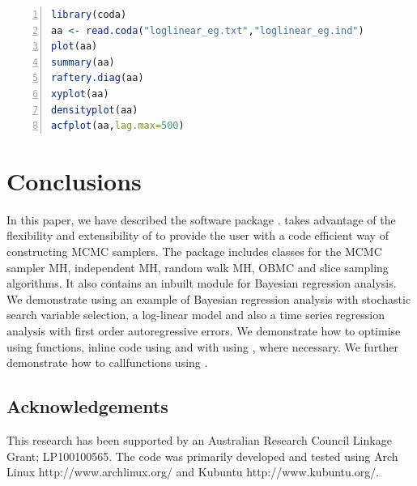 \documentclass[article]{jss}
\begin{document}
\begin{lstlisting}[basicstyle={\scriptsize},language=R,numbers=left]
library(coda)
aa <- read.coda("loglinear_eg.txt","loglinear_eg.ind")
plot(aa)
summary(aa)
raftery.diag(aa)
xyplot(aa)
densityplot(aa)
acfplot(aa,lag.max=500)

\end{lstlisting}



\section{Conclusions}
\label{sec:Conclusions}

In this paper, we have described the  software
package .   takes advantage of the flexibility
and extensibility of  to provide the user with a code
efficient way of constructing MCMC samplers. The  package
includes classes for the MCMC sampler MH, independent MH, random walk
MH, OBMC and slice sampling algorithms.  It also contains an inbuilt
module for Bayesian regression analysis.  We demonstrate 
using an example of Bayesian regression analysis with stochastic
search variable selection, a log-linear model and also a time series
regression analysis with first order autoregressive errors. We
demonstrate how to optimise  using  functions,
inline  code using  and with
 using , where necessary.  We further
demonstrate how to callfunctions using .


\subsection*{Acknowledgements}

This research has been supported by an Australian Research Council
Linkage Grant; LP100100565. The code was primarily developed and
tested using Arch Linux http://www.archlinux.org/ and Kubuntu
http://www.kubuntu.org/.


\end{document}
